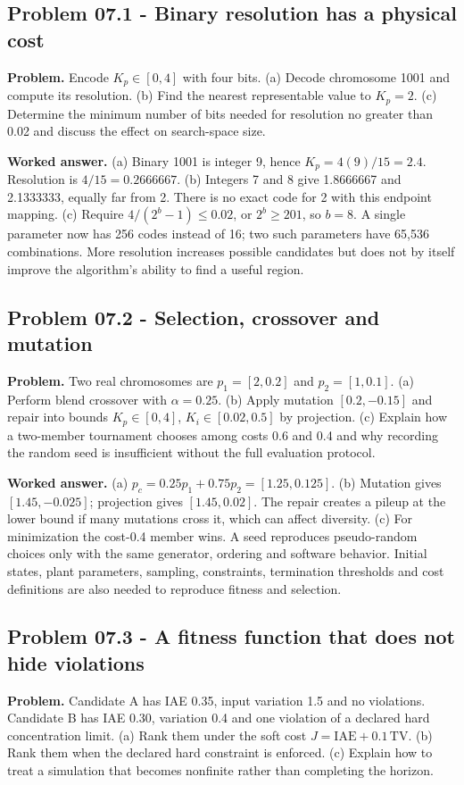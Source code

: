 \documentclass[11pt,a4paper]{article}
\begin{document}
\subsection{Problem 07.1 - Binary resolution has a physical cost}
\textbf{Problem.} Encode $K_p\in[0,4]$ with four bits. (a) Decode chromosome 1001 and compute its resolution. (b) Find the nearest representable value to $K_p=2$. (c) Determine the minimum number of bits needed for resolution no greater than 0.02 and discuss the effect on search-space size.


\textbf{Worked answer.} (a) Binary 1001 is integer 9, hence $K_p=4(9)/15=2.4$. Resolution is $4/15=0.2666667$. (b) Integers 7 and 8 give 1.8666667 and 2.1333333, equally far from 2. There is no exact code for 2 with this endpoint mapping. (c) Require $4/(2^b-1)\leq0.02$, or $2^b\geq201$, so $b=8$. A single parameter now has 256 codes instead of 16; two such parameters have 65,536 combinations. More resolution increases possible candidates but does not by itself improve the algorithm's ability to find a useful region.

\subsection{Problem 07.2 - Selection, crossover and mutation}
\textbf{Problem.} Two real chromosomes are $p_1=[2,0.2]$ and $p_2=[1,0.1]$. (a) Perform blend crossover with $\alpha=0.25$. (b) Apply mutation $[0.2,-0.15]$ and repair into bounds $K_p\in[0,4]$, $K_i\in[0.02,0.5]$ by projection. (c) Explain how a two-member tournament chooses among costs 0.6 and 0.4 and why recording the random seed is insufficient without the full evaluation protocol.


\textbf{Worked answer.} (a) $p_c=0.25p_1+0.75p_2=[1.25,0.125]$. (b) Mutation gives $[1.45,-0.025]$; projection gives $[1.45,0.02]$. The repair creates a pileup at the lower bound if many mutations cross it, which can affect diversity. (c) For minimization the cost-0.4 member wins. A seed reproduces pseudo-random choices only with the same generator, ordering and software behavior. Initial states, plant parameters, sampling, constraints, termination thresholds and cost definitions are also needed to reproduce fitness and selection.

\subsection{Problem 07.3 - A fitness function that does not hide violations}
\textbf{Problem.} Candidate A has IAE 0.35, input variation 1.5 and no violations. Candidate B has IAE 0.30, variation 0.4 and one violation of a declared hard concentration limit. (a) Rank them under the soft cost $J=\mathrm{IAE}+0.1\,\mathrm{TV}$. (b) Rank them when the declared hard constraint is enforced. (c) Explain how to treat a simulation that becomes nonfinite rather than completing the horizon.
\end{document}
